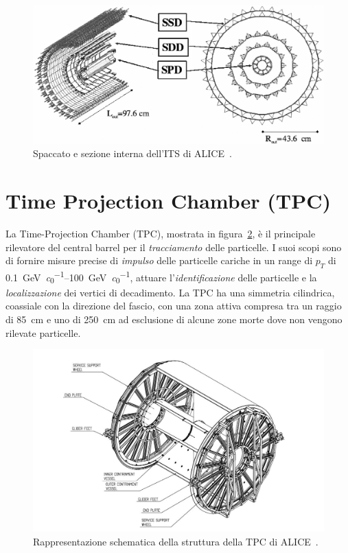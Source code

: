     \begin{figure}[h]
        \centering
        \includegraphics[width=1\linewidth]{res/fig/2-chapter/4-ALICE-ITS.jpg}
        \caption{Spaccato e sezione interna dell'ITS di ALICE~\cite{ALICE_2008}.}
        \label{fig:2-4-ALICE-ITS}
    \end{figure}

\section{Time Projection Chamber (TPC)}
    La Time-Projection Chamber (TPC), mostrata in figura~\ref{fig:2-5-ALICE-TPC}, è il principale rilevatore del central barrel per il \textit{tracciamento} delle particelle. I suoi scopi sono di fornire misure precise di \textit{impulso} delle particelle cariche in un range di $p_{T}$ di \qtyrange[per-mode = symbol, range-phrase = --, range-units = single]{0.1}{100}{\giga \eV \per \clight}, attuare l’\textit{identificazione} delle particelle e la \textit{localizzazione} dei vertici di decadimento. La TPC ha una simmetria cilindrica, coassiale con la direzione del fascio, con una zona attiva compresa tra un raggio di \qty{85}{\centi \meter} e uno di \qty{250}{\centi \meter} ad esclusione di alcune zone morte dove non vengono rilevate particelle.

    \begin{figure}[h]
        \centering
        \includegraphics[width=0.8\linewidth]{res/fig/2-chapter/5-ALICE-TPC.jpg}
        \caption{Rappresentazione schematica della struttura della TPC di ALICE~\cite{Korcari_2017}.}
        \label{fig:2-5-ALICE-TPC}
    \end{figure}

